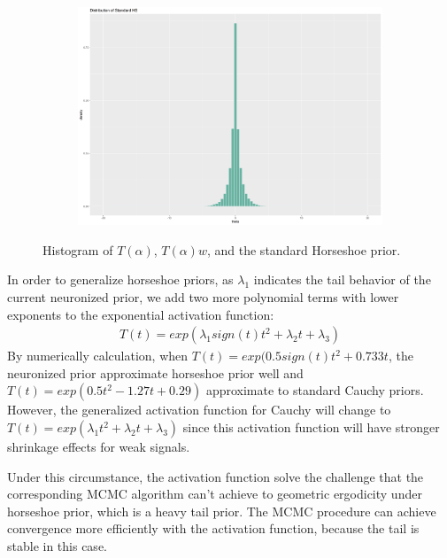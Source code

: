 \begin{figure}[t]
\begin{subfigure}[b]{0.49\textwidth}
         \includegraphics[width=\textwidth]{Figures/HSprior3.png}
     \end{subfigure}
        \caption{Histogram of $T(\alpha)$, $T(\alpha)w$, and the standard Horseshoe prior.}
        \label{fig:HS_prior}
\end{figure}

    In order to generalize horseshoe priors, as $\lambda_1$ indicates the tail behavior of the current neuronized prior, we add two more polynomial terms with lower exponents to the exponential activation function:
    \begin{align}
        T(t)=exp(\lambda_1 sign(t)t^2+\lambda_2 t+\lambda_3)
    \end{align}
    By numerically calculation, when $T(t)=exp(0.5 sign(t)t^2+0.733 t$, the neuronized prior approximate horseshoe prior well and $T(t)=exp(0.5 t^2-1.27t+0.29)$ approximate to standard Cauchy priors\cite{shin2021neuronized}. However, the generalized activation function for Cauchy will change to $T(t)=exp(\lambda_1 t^2+\lambda_2 t+\lambda_3)$ since this activation function will have stronger shrinkage effects for weak signals.
    
    Under this circumstance, the activation function solve the challenge that the corresponding MCMC algorithm can't achieve to geometric ergodicity under horseshoe prior, which is a heavy tail prior\cite{k1996the}. The MCMC procedure can achieve convergence more efficiently with the activation function, because the tail is stable in this case. 
   
